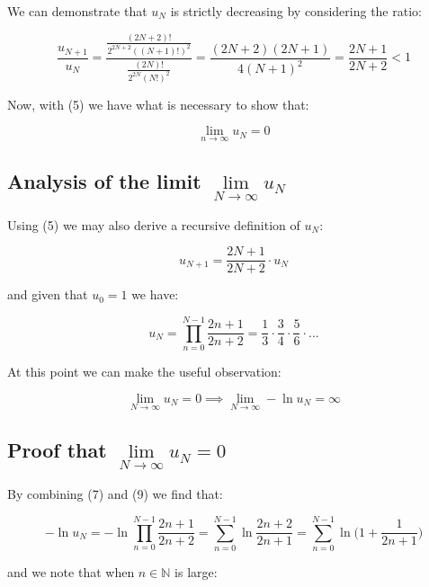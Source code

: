 \documentclass{article}
\begin{document}
We can demonstrate that $u_N$ is strictly decreasing by considering the ratio:

\begin{equation}
\frac{u_{N+1}}{u_N}=\frac{\frac{(2N+2)!}{2^{2N+2}((N+1)!)^2}}{\frac{(2N)!}{2^{2N}(N!)^2}}=\frac{(2N+2)(2N+1)}{4(N+1)^2}=\frac{2N+1}{2N+2} < 1
\end{equation}

Now, with (5) we have what is necessary to show that:

\begin{equation}
\lim_{n \to \infty} u_N = 0
\end{equation}

\newpage

\subsection{Analysis of the limit $\lim\limits_{N \to \infty} u_N$}

Using (5) we may also derive a recursive definition of $u_N$:

\begin{equation}
u_{N+1}=\frac{2N+1}{2N+2} \cdot u_N
\end{equation}

and given that $u_0=1$ we have:

\begin{equation}
u_{N}=\prod_{n=0}^{N-1} \frac{2n+1}{2n+2}= \frac{1}{3} \cdot \frac{3}{4} \cdot \frac{5}{6} \cdot ...
\end{equation}

At this point we can make the useful observation:

\begin{equation}
\lim_{N \to \infty} u_N = 0 \implies \lim_{N \to \infty} - \ln u_N = \infty
\end{equation}

\subsection{Proof that $\lim\limits_{N \to \infty} u_N=0$}

By combining (7) and (9) we find that:

\begin{equation}
-\ln u_N = -\ln \prod_{n=0}^{N-1} \frac{2n+1}{2n+2}= \sum_{n=0}^{N-1} \ln \frac{2n+2}{2n+1}= \sum_{n=0}^{N-1} \ln \big(1+\frac{1}{2n+1}\big)
\end{equation}

and we note that when $n\in \mathbb{N}$ is large:
\end{document}
